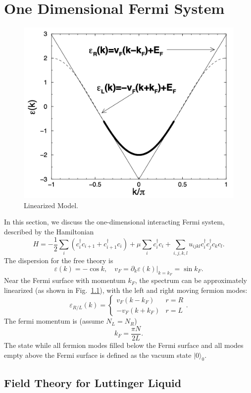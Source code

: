 \chapter{One Dimensional Fermi System}

\begin{figure}
	\centering
	\includegraphics[width=0.4\linewidth]{pics/FL-linearize.png}
	\caption{Linearized Model.}
	\label{fig:bs-linearize}
\end{figure}

In this section, we discuss the one-dimensional interacting Fermi system, described by the Hamiltonian
\begin{equation}
	H = -\frac{1}{2}\sum_{i} (c_i^\dagger c_{i+1} + c_{i+1}^\dagger c_i) + \mu\sum_i c_i^\dagger c_i + \sum_{i,j,k,l} u_{ijkl} c_i^\dagger c_j^\dagger c_k c_l.
\end{equation}
The dispersion for the free theory is 
\begin{equation}
	\varepsilon(k) = -\cos k, \quad 
	v_F = \partial_k \varepsilon(k)|_{k=k_F} = \sin k_F.
\end{equation}
Near the Fermi surface with momentum $k_F$, the spectrum can be approximately linearized (as shown in Fig.~\ref{fig:bs-linearize}), with the left and right moving fermion modes:
\begin{equation}
	\varepsilon_{R/L}(k) = \begin{cases}
		v_F (k - k_F) & r=R \\
		-v_F (k + k_F) & r=L
	\end{cases}.
\end{equation}
The fermi momentum is (assume $N_L=N_R$)
\begin{equation}
	k_F = \frac{\pi N}{2L}.
\end{equation}
The state while all fermion modes filled below the Fermi surface and all modes empty above the Fermi surface is defined as the vacuum state $|0\rangle_0$.



\section{Field Theory for Luttinger Liquid}

